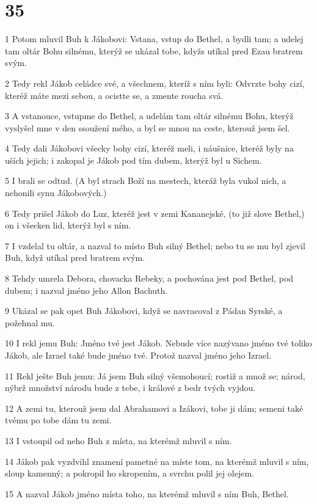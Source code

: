 \chapter{35}

\par 1 Potom mluvil Buh k Jákobovi: Vstana, vstup do Bethel, a bydli tam; a udelej tam oltár Bohu silnému, kterýž se ukázal tobe, kdyžs utíkal pred Ezau bratrem svým.
\par 2 Tedy rekl Jákob celádce své, a všechnem, kteríž s ním byli: Odvrzte bohy cizí, kteréž máte mezi sebou, a ocistte se, a zmente roucha svá.
\par 3 A vstanouce, vstupme do Bethel, a udelám tam oltár silnému Bohu, kterýž vyslyšel mne v den ssoužení mého, a byl se mnou na ceste, kterouž jsem šel.
\par 4 Tedy dali Jákobovi všecky bohy cizí, kteréž meli, i náušnice, kteréž byly na uších jejich; i zakopal je Jákob pod tím dubem, kterýž byl u Sichem.
\par 5 I brali se odtud. (A byl strach Boží na mestech, kteráž byla vukol nich, a nehonili synu Jákobových.)
\par 6 Tedy prišel Jákob do Luz, kteréž jest v zemi Kananejské, (to již slove Bethel,) on i všecken lid, kterýž byl s ním.
\par 7 I vzdelal tu oltár, a nazval to místo Buh silný Bethel; nebo tu se mu byl zjevil Buh, když utíkal pred bratrem svým.
\par 8 Tehdy umrela Debora, chovacka Rebeky, a pochována jest pod Bethel, pod dubem; i nazval jméno jeho Allon Bachuth.
\par 9 Ukázal se pak opet Buh Jákobovi, když se navracoval z Pádan Syrské, a požehnal mu.
\par 10 I rekl jemu Buh: Jméno tvé jest Jákob. Nebude více nazývano jméno tvé toliko Jákob, ale Izrael také bude jméno tvé. Protož nazval jméno jeho Izrael.
\par 11 Rekl ješte Buh jemu: Já jsem Buh silný všemohoucí; rostiž a množ se; národ, nýbrž množství národu bude z tebe, i králové z bedr tvých vyjdou.
\par 12 A zemi tu, kterouž jsem dal Abrahamovi a Izákovi, tobe ji dám; semeni také tvému po tobe dám tu zemi.
\par 13 I vstoupil od neho Buh z místa, na kterémž mluvil s ním.
\par 14 Jákob pak vyzdvihl znamení pametné na míste tom, na kterémž mluvil s ním, sloup kamenný; a pokropil ho skropením, a svrchu polil jej olejem.
\par 15 A nazval Jákob jméno místa toho, na kterémž mluvil s ním Buh, Bethel.
